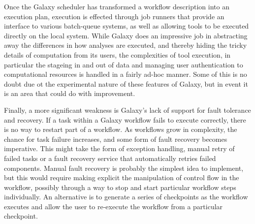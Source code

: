 \documentclass[a4paper,10pt]{scrreprt}
\begin{document}
Once the Galaxy scheduler has transformed a workflow description into an execution plan, execution is effected through job runners that provide an interface to various batch-queue systems, as well as allowing tools to be executed directly on the local system. While Galaxy does an impressive job in abstracting away the differences in how analyses are executed, and thereby hiding the tricky details of computation from its users, the complexities of tool execution, in particular the stageing in and out of data and managing user authentication to computational resources is handled in a fairly ad-hoc manner. Some of this is no doubt due ot the experimental nature of these features of Galaxy, but in event it is an area that could do with improvement.

Finally, a more significant weakness is Galaxy's lack of support for fault tolerance and recovery. If a task within a Galaxy workflow fails to execute correctly, there is no way to restart part of a workflow. As workflows grow in complexity, the chance for task failure increases, and some form of fault recovery becomes imperative. This might take the form of exception handling, manual retry of failed tasks or a fault recovery service that automatically retries failed components. Manual fault recovery is probably the simplest idea to implement, but this would require making explicit the manipulation of control flow in the workflow, possibly through a way to stop and start particular workflow steps individually. An alternative is to generate a series of checkpoints as the workflow executes and allow the user to re-execute the workflow from a particular checkpoint.
\end{document}
